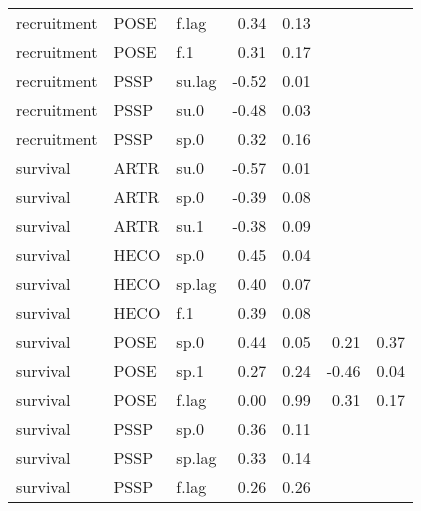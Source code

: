 \begin{table}[ht]
\begin{tabular}{lllrrrr}
  recruitment & POSE & f.lag & 0.34 & 0.13 &  &  \\ 
  recruitment & POSE & f.1 & 0.31 & 0.17 &  &  \\ 
  recruitment & PSSP & su.lag & -0.52 & 0.01 &  &  \\ 
  recruitment & PSSP & su.0 & -0.48 & 0.03 &  &  \\ 
  recruitment & PSSP & sp.0 & 0.32 & 0.16 &  &  \\ 
  survival & ARTR & su.0 & -0.57 & 0.01 &  &  \\ 
  survival & ARTR & sp.0 & -0.39 & 0.08 &  &  \\ 
  survival & ARTR & su.1 & -0.38 & 0.09 &  &  \\ 
  survival & HECO & sp.0 & 0.45 & 0.04 &  &  \\ 
  survival & HECO & sp.lag & 0.40 & 0.07 &  &  \\ 
  survival & HECO & f.1 & 0.39 & 0.08 &  &  \\ 
  survival & POSE & sp.0 & 0.44 & 0.05 & 0.21 & 0.37 \\ 
  survival & POSE & sp.1 & 0.27 & 0.24 & -0.46 & 0.04 \\ 
  survival & POSE & f.lag & 0.00 & 0.99 & 0.31 & 0.17 \\ 
  survival & PSSP & sp.0 & 0.36 & 0.11 &  &  \\ 
  survival & PSSP & sp.lag & 0.33 & 0.14 &  &  \\ 
  survival & PSSP & f.lag & 0.26 & 0.26 &  &  \\ 
   \hline
\end{tabular}
\end{table}
